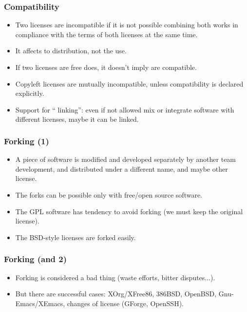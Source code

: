 \begin{frame}
\frametitle{Compatibility}

\begin{itemize}
\item Two licenses are incompatible if it is not possible combining both works in compliance with the terms of  both licenses at the same time. 
\item It affects to distribution, not the use. 
\item If two licenses are free does, it doesn't imply are compatible. 
\item Copyleft licenses are mutually incompatible, unless compatibility is declared explicitly. 
\item Support for `` linking'': even if not allowed mix or integrate software with different licenses, maybe it can be linked. 
\end{itemize}

\end{frame}


\begin{frame}
\frametitle{Forking (1)}

\begin{itemize}
\item A piece of software is modified and developed separately by another team development, and distributed under a different name, and maybe other
license.
\item The forks can be possible \alert{only} with free/open source software.
\item The GPL software has tendency to avoid forking (we must keep the original license).
\item The BSD-style licenses are forked easily.
\end{itemize}

\end{frame}


\begin{frame}
\frametitle{Forking (and 2)}

\begin{itemize}
\item Forking is considered a bad thing (waste efforts, bitter disputes...).
\item But there are successful cases: XOrg/XFree86, 386BSD, OpenBSD, Gnu-Emacs/XEmacs, changes of license (GForge, OpenSSH).
\end{itemize}

\end{frame}


